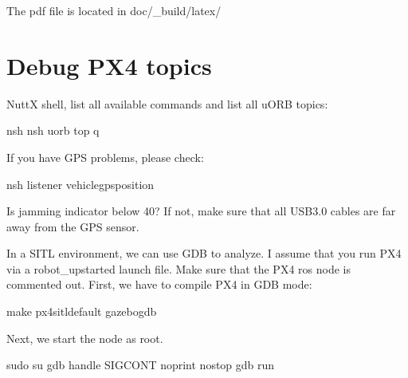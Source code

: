 \documentclass[letterpaper,10pt,english]{sphinxmanual}
\begin{document}
The pdf file is located in doc/\_build/latex/


\section{Debug PX4 topics}
\label{\detokenize{source/howtos/debug_px4:debug-px4-topics}}\label{\detokenize{source/howtos/debug_px4::doc}}
NuttX shell, list all available commands and list all uORB topics:

\begin{sphinxVerbatim}[commandchars=\\\{\}]
nsh\PYGZgt{} 
nsh\PYGZgt{} uorb top
q
\end{sphinxVerbatim}

If you have GPS problems, please check:

\begin{sphinxVerbatim}[commandchars=\\\{\}]
nsh\PYGZgt{} listener vehicle\PYGZus{}gps\PYGZus{}position
\end{sphinxVerbatim}

Is jamming indicator below 40? If not, make sure that all USB3.0 cables are far away from the GPS sensor.

In a SITL environment, we can use GDB to analyze. I assume that you run PX4 via a robot\_upstarted launch file. Make sure that the PX4 ros node is commented out. First, we have to compile PX4 in GDB mode:

\begin{sphinxVerbatim}[commandchars=\\\{\}]
 make px4\PYGZus{}sitl\PYGZus{}default gazebo\PYGZus{}\PYGZus{}\PYGZus{}gdb
\end{sphinxVerbatim}

Next, we start the node as root.

\begin{sphinxVerbatim}[commandchars=\\\{\}]
\PYGZdl{} sudo su \PYGZhy{}
gdb handle SIGCONT noprint nostop
gdb run
\end{sphinxVerbatim}
\end{document}
